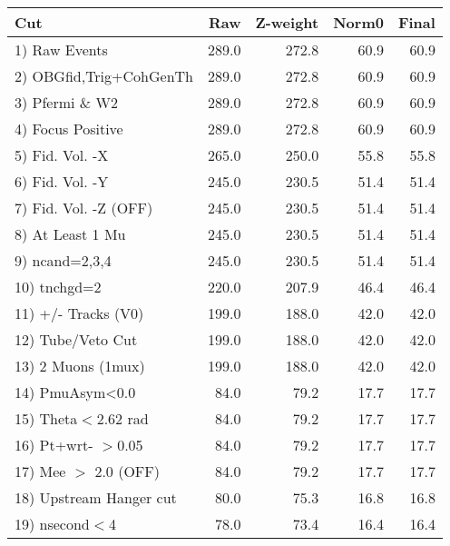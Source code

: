  \begin{table}[h!]\centering
 \begin{tabular}{||l||r|r|r|r||}
 \hline
 \hline
 Cut & Raw & Z-weight & Norm0 & Final \\
 \hline
  1) Raw Events           &       289.0 &       272.8 &        60.9 &        60.9 \\
  2) OBGfid,Trig+CohGenTh &       289.0 &       272.8 &        60.9 &        60.9 \\
  3) Pfermi \& W2         &       289.0 &       272.8 &        60.9 &        60.9 \\
  4) Focus Positive       &       289.0 &       272.8 &        60.9 &        60.9 \\
  5) Fid. Vol. -X         &       265.0 &       250.0 &        55.8 &        55.8 \\
  6) Fid. Vol. -Y         &       245.0 &       230.5 &        51.4 &        51.4 \\
  7) Fid. Vol. -Z (OFF)   &       245.0 &       230.5 &        51.4 &        51.4 \\
  8) At Least 1 Mu        &       245.0 &       230.5 &        51.4 &        51.4 \\
  9) ncand=2,3,4          &       245.0 &       230.5 &        51.4 &        51.4 \\
 10) tnchgd=2             &       220.0 &       207.9 &        46.4 &        46.4 \\
 11) +/- Tracks (V0)      &       199.0 &       188.0 &        42.0 &        42.0 \\
 12) Tube/Veto Cut        &       199.0 &       188.0 &        42.0 &        42.0 \\
 13) 2 Muons (1mux)       &       199.0 &       188.0 &        42.0 &        42.0 \\
 14) PmuAsym<0.0          &        84.0 &        79.2 &        17.7 &        17.7 \\
 15) Theta$<$2.62 rad     &        84.0 &        79.2 &        17.7 &        17.7 \\
 16) Pt+wrt- $>$0.05      &        84.0 &        79.2 &        17.7 &        17.7 \\
 17) Mee $>$ 2.0  (OFF)   &        84.0 &        79.2 &        17.7 &        17.7 \\
 18) Upstream Hanger cut  &        80.0 &        75.3 &        16.8 &        16.8 \\
 19) nsecond$<$4          &        78.0 &        73.4 &        16.4 &        16.4 \\

\end{tabular}
\end{table}
